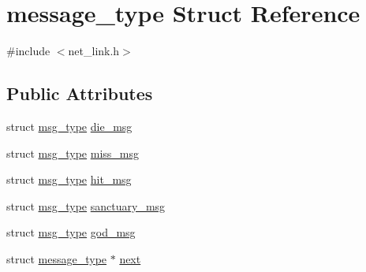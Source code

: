\hypertarget{structmessage__type}{\section{message\-\_\-type Struct Reference}
\label{structmessage__type}
}


{\ttfamily \#include $<$net\-\_\-link.\-h$>$}

\subsection*{Public Attributes}
\begin{DoxyCompactItemize}
\item 
struct \hyperlink{structmsg__type}{msg\-\_\-type} \hyperlink{structmessage__type_a80133b1d5675854fbf911df074e17290}{die\-\_\-msg}
\item 
struct \hyperlink{structmsg__type}{msg\-\_\-type} \hyperlink{structmessage__type_ad17635689f46c02c4e09f3c38a06a796}{miss\-\_\-msg}
\item 
struct \hyperlink{structmsg__type}{msg\-\_\-type} \hyperlink{structmessage__type_ad9bb87d7fe2057fd8fffb7cbcdd7f59c}{hit\-\_\-msg}
\item 
struct \hyperlink{structmsg__type}{msg\-\_\-type} \hyperlink{structmessage__type_a520d0384870088e1313600b674b03e85}{sanctuary\-\_\-msg}
\item 
struct \hyperlink{structmsg__type}{msg\-\_\-type} \hyperlink{structmessage__type_ac5ad50968cab26b2471918bef0af98e8}{god\-\_\-msg}
\item 
struct \hyperlink{structmessage__type}{message\-\_\-type} $\ast$ \hyperlink{structmessage__type_ab057ca90031d1883592f0437e9ef0db6}{next}
\end{DoxyCompactItemize}


